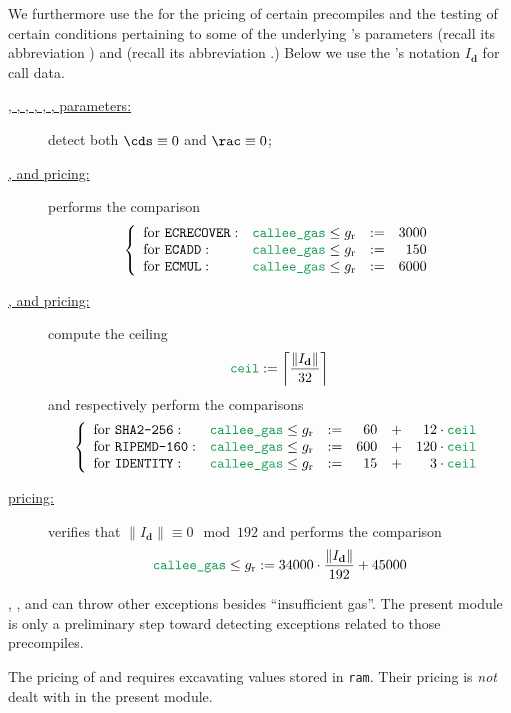 We furthermore use the \oobMod{} for the pricing of certain precompiles and the testing of certain conditions pertaining to some of the underlying 's parameters
\CDS{} (recall its abbreviation \cds{}) and
\RAC{} (recall its abbreviation \rac{}.)
\saNote{} Below we use the \cite{EYP-London}'s notation $I_\textbf{d}$ for call data.
\begin{description}
	\item[\underline{, , , , , ,  parameters:}]
		detect both $\cds \equiv 0$ and $\rac \equiv 0$; 
	\item[\underline{,  and  pricing:}]
		performs the comparison
		\[
			\left\{ \begin{array}{llcrcl}
				\text{for }\inst{ECRECOVER}   : & \locCalleeGas \leq g_\text{r} & := & 3000 \\
				\text{for }\inst{ECADD}       : & \locCalleeGas \leq g_\text{r} & := &  150 \\
				\text{for }\inst{ECMUL}       : & \locCalleeGas \leq g_\text{r} & := & 6000 \\
			\end{array} \right.
		\]
	\item[\underline{,  and  pricing:}]
		compute the ceiling
		\[
			\loc{ceil} := \left \lceil \frac{\| I_\textbf{d} \|}{32} \right \rceil
		\]
		and respectively perform the comparisons
		\[
			\left\{ \begin{array}{llcrcr}
				\text{for }\inst{SHA2-256}   : & \locCalleeGas \leq g_\text{r} & := & 60  & + & 12  \cdot \locCeil  \\
				\text{for }\inst{RIPEMD-160} : & \locCalleeGas \leq g_\text{r} & := & 600 & + & 120 \cdot \locCeil  \\
				\text{for }\inst{IDENTITY}   : & \locCalleeGas \leq g_\text{r} & := & 15  & + & 3   \cdot \locCeil  \\
			\end{array} \right.
		\]
	\item[\underline{ pricing:}]
		verifies that $\| I_\textbf{d} \| \equiv 0 \mod 192$ and performs the comparison 
		\[ \locCalleeGas \leq g_\text{r} := 34000 \cdot \frac{\| I_\textbf{d} \|}{192} + 45000 \]
\end{description}

\saNote{}
, ,  and  can throw other exceptions besides ``insufficient gas''.
The present module is only a preliminary step toward detecting exceptions related to those precompiles.

\saNote{}
The pricing of  and  requires excavating values stored in \texttt{ram}. Their pricing is \emph{not} dealt with in the present module. 
